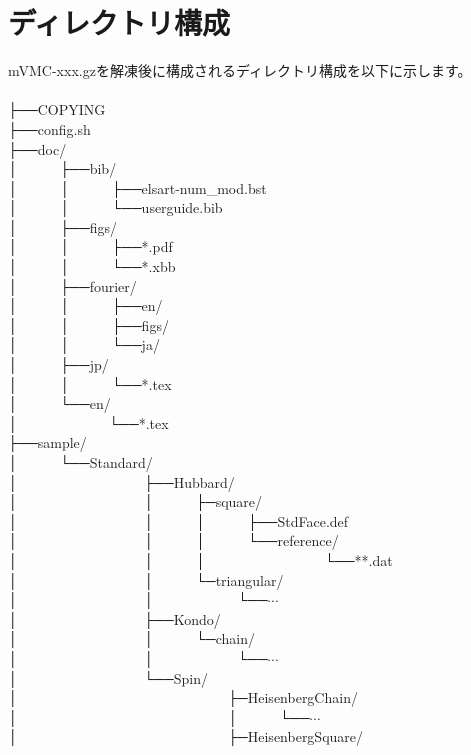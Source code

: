 \section{ディレクトリ構成}
mVMC-xxx.gzを解凍後に構成されるディレクトリ構成を以下に示します。\\
\\
├──COPYING\\
├──config.sh\\
├──doc/\\
│~~~~~~├──bib/\\
│~~~~~~│~~~~~~├──elsart-num\_mod.bst\\
│~~~~~~│~~~~~~└──userguide.bib\\
│~~~~~~├──figs/\\
│~~~~~~│~~~~~~├──*.pdf\\
│~~~~~~│~~~~~~└──*.xbb\\
│~~~~~~├──fourier/\\
│~~~~~~│~~~~~~├──en/\\
│~~~~~~│~~~~~~├──figs/\\
│~~~~~~│~~~~~~└──ja/\\
│~~~~~~├──jp/\\
│~~~~~~│~~~~~~└──*.tex\\
│~~~~~~└──en/\\
│~~~~~~~~~~~~~└──*.tex\\
├──sample/\\
│~~~~~~└──Standard/\\
│~~~~~~~~~~~~~~~~~~├──Hubbard/\\
│~~~~~~~~~~~~~~~~~~│~~~~~~├─square/\\
│~~~~~~~~~~~~~~~~~~│~~~~~~│~~~~~~├──StdFace.def\\
│~~~~~~~~~~~~~~~~~~│~~~~~~│~~~~~~└──reference/\\
│~~~~~~~~~~~~~~~~~~│~~~~~~│~~~~~~~~~~~~~~~~~└──**.dat\\
│~~~~~~~~~~~~~~~~~~│~~~~~~└─triangular/\\
│~~~~~~~~~~~~~~~~~~│~~~~~~~~~~~~└──$\cdots$\\
│~~~~~~~~~~~~~~~~~~├──Kondo/\\
│~~~~~~~~~~~~~~~~~~│~~~~~~└─chain/\\
│~~~~~~~~~~~~~~~~~~│~~~~~~~~~~~~└──$\cdots$\\
│~~~~~~~~~~~~~~~~~~└──Spin/\\
│~~~~~~~~~~~~~~~~~~~~~~~~~~~~~~├─HeisenbergChain/\\
│~~~~~~~~~~~~~~~~~~~~~~~~~~~~~~│~~~~~~└──$\cdots$\\
│~~~~~~~~~~~~~~~~~~~~~~~~~~~~~~├─HeisenbergSquare/\\
